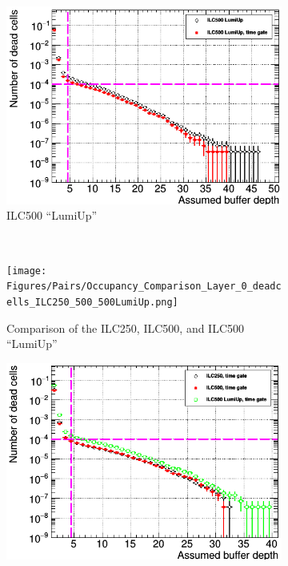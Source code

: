 \begin{figure}
\begin{subfigure}[t]{0.49\textwidth}
    \includegraphics[width=\textwidth]{Figures/Pairs/Occupancy_Comparison_Layer_0_deadcells_ILC500LumiUp_TimeGate.png}
   \caption{ILC500 ``LumiUp''}
   \end{subfigure}
      \hfill
   \begin{minipage}{0.49\textwidth}
   \hfill
    \end{minipage}\\
  \begin{subfigure}[t]{0.49\textwidth}
   \centering
    \texttt{[image: Figures/Pairs/Occupancy\_Comparison\_Layer\_0\_deadcells\_ILC250\_500\_500LumiUp.png]}
   \caption{Comparison of the ILC250, ILC500, and ILC500 ``LumiUp''}
   \end{subfigure}
   \hfill
    \begin{subfigure}[t]{0.49\textwidth}
   \centering
    \includegraphics[width=\textwidth]{Figures/Pairs/Occupancy_Comparison_Layer_0_deadcells_ILC250_500_500LumiUp_TimeGate.png}

\end{subfigure}
\end{figure}
